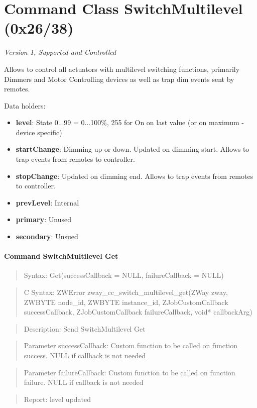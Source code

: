 \section{Command Class SwitchMultilevel (0x26/38)}

\textit{Version 1, Supported and Controlled}
\newline

Allows to control all actuators with multilevel switching functions, primarily Dimmers and Motor Controlling devices as well as trap dim events sent by remotes.
\newline

\noindent
Data holders:

\begin{itemize}
\item \textbf{level}: State 0...99 = 0...100\%, 255 for On on last value (or on maximum - device specific)
\item \textbf{startChange}: Dimming up or down. Updated on dimming start. Allows to trap events from remotes to controller.
\item \textbf{stopChange}: Updated on dimming end. Allows to trap events from remotes to controller.
\item \textbf{prevLevel}: Internal
\item \textbf{primary}: Unused
\item \textbf{secondary}: Unsued
\end{itemize}

\paragraph{Command SwitchMultilevel Get}
\begin{quote}Syntax: Get(successCallback = NULL, failureCallback = NULL)\end{quote}
\begin{quote}C Syntax: ZWError zway\_cc\_switch\_multilevel\_get(ZWay zway, ZWBYTE node\_id, ZWBYTE instance\_id, ZJobCustomCallback successCallback, ZJobCustomCallback failureCallback, void* callbackArg)\end{quote}
\begin{quote}Description: Send SwitchMultilevel Get\end{quote}
\begin{quote}Parameter successCallback: Custom function to be called on function success. NULL if callback is not needed\end{quote}
\begin{quote}Parameter failureCallback: Custom function to be called on function failure. NULL if callback is not needed\end{quote}
\begin{quote}Report: level updated\end{quote}

